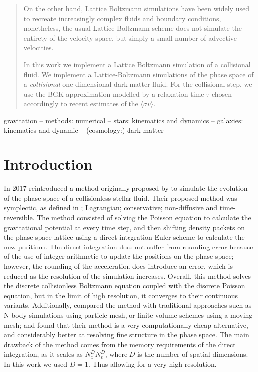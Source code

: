 \documentclass[fleqn,usenatbib]{mnras}
\newcommand{\crosssection}{\langle \sigma v \rangle}
\begin{document}
\begin{abstract}
On the other hand, Lattice Boltzmann simulations have been widely used to recreate increasingly complex fluids and boundary conditions, nonetheless, the usual Lattice-Boltzmann scheme does not simulate the entirety of the velocity space, but simply a small number of advective velocities.

In this work we implement a Lattice Boltzmann simulation of a collisional fluid. We implement a Lattice-Boltzmann simulations of the phase space of a \emph{collisional} one dimensional dark matter fluid. For the collisional step, we use the BGK approximation modelled by a relaxation time $\tau$ chosen accordingly to recent estimates of the $\crosssection$.
\end{abstract}

\begin{keywords}
gravitation -- methods: numerical -- stars: kinematics and dynamics -- galaxies: kinematics and dynamic -- (cosmology:) dark matter
\end{keywords}



\section{Introduction}
\label{sec: intro}
In 2017 \citet{integerLatticeDynamics} reintroduced a method originally proposed by \citet{latticeStellarDynamics} to simulate the evolution of the phase space of a collisionless stellar fluid. Their proposed method was symplectic, as defined in \citet{1992PhyD...56....1E}; Lagrangian; conservative; non-diffusive and time-reversible.
The method consisted of solving the Poisson equation to calculate the gravitational potential at every time step, and then shifting density packets on the phase space lattice using a direct integration Euler scheme to calculate the new positions. 
The direct integration does not suffer from rounding error because of the use of integer arithmetic to update the positions on the phase space; however, the rounding of the acceleration does introduce an error, which is reduced as the resolution of the simulation increases. 
Overall, this method solves the discrete collisionless Boltzmann equation coupled with the discrete Poisson equation, but in the limit of high resolution, it converges to their continuous variants. 
Additionally, \citeauthor{integerLatticeDynamics} compared the method with traditional approaches such as N-body simulations using particle mesh, or finite volume schemes using a moving mesh; and found that their method is a very computationally cheap alternative, and considerably better at resolving fine structure in the phase space.
The main drawback of the method comes from the memory requirements of the direct integration, as it scales as $N_x^D N_v^D$, where $D$ is the number of spatial dimensions. In this work we used $D = 1$. Thus allowing for a very high resolution.
\end{document}
